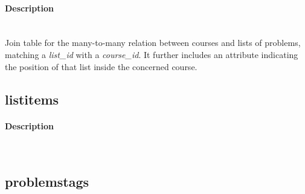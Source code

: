 \documentclass[../main.tex]{subfiles}
\begin{document}
\paragraph{Description}~\\ %
Join table for the many-to-many relation between courses and lists of problems, matching a \emph{list\_id} with a \emph{course\_id}. It further includes an attribute indicating the position of that list inside the concerned course. 




\subsection{listitems} %
\label{sub:listitems}

\begin{figure}
  \vspace{-20pt}
  \begin{center}
  \end{center}
  \vspace{-20pt}
\end{figure}

\paragraph{Description}~\\ %
\lipsum[2-3]



\subsection{problemstags} %
\label{sub:problemstags}

\begin{figure}
  \vspace{-20pt}
  \begin{center}
  \end{center}
  \vspace{-20pt}
\end{figure}
\end{document}
